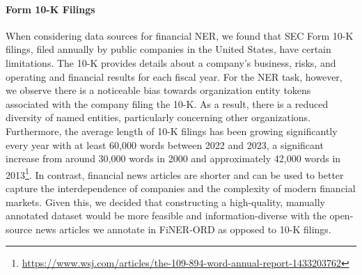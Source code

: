 \documentclass[11pt]{article}
\begin{document}
\paragraph{Form 10-K Filings} 
When considering data sources for financial NER, we found that SEC Form 10-K filings, filed annually by public companies in the United States, have certain limitations. The 10-K provides details about a company's business, risks, and operating and financial results for each fiscal year. For the NER task, however, we observe there is a noticeable bias towards organization entity tokens associated with the company filing the 10-K. As a result, there is a reduced diversity of named entities, particularly concerning other organizations. Furthermore, the average length of 10-K filings has been growing significantly every year with at least 60,000 words between 2022 and 2023, a significant increase from around 30,000 words in 2000 and approximately 42,000 words in 2013\footnote{\url{https://www.wsj.com/articles/the-109-894-word-annual-report-1433203762}}. In contrast, financial news articles are shorter and can be used to better capture the interdependence of companies and the complexity of modern financial markets. Given this, we decided that constructing a high-quality, manually annotated dataset would be more feasible and information-diverse with the open-source news articles we annotate in FiNER-ORD as opposed to 10-K filings.






\appendix

\end{document}
